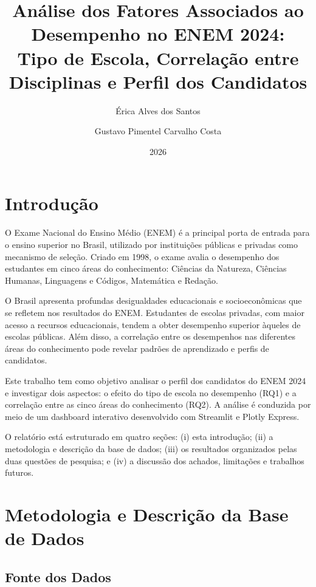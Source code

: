 \documentclass[a4paper,12pt]{article}
\title{Análise dos Fatores Associados ao Desempenho no ENEM 2024:\\
Tipo de Escola, Correlação entre Disciplinas e Perfil dos Candidatos}
\author{Érica Alves dos Santos \and Gustavo Pimentel Carvalho Costa}
\date{2026}
\begin{document}
\maketitle
\thispagestyle{empty}
\newpage

\section{Introdução}

O Exame Nacional do Ensino Médio (ENEM) é a principal porta de entrada para o ensino superior no Brasil, utilizado por instituições públicas e privadas como mecanismo de seleção. Criado em 1998, o exame avalia o desempenho dos estudantes em cinco áreas do conhecimento: Ciências da Natureza, Ciências Humanas, Linguagens e Códigos, Matemática e Redação.

O Brasil apresenta profundas desigualdades educacionais e socioeconômicas que se refletem nos resultados do ENEM. Estudantes de escolas privadas, com maior acesso a recursos educacionais, tendem a obter desempenho superior àqueles de escolas públicas. Além disso, a correlação entre os desempenhos nas diferentes áreas do conhecimento pode revelar padrões de aprendizado e perfis de candidatos.

Este trabalho tem como objetivo analisar o perfil dos candidatos do ENEM 2024 e investigar dois aspectos: o efeito do tipo de escola no desempenho (RQ1) e a correlação entre as cinco áreas do conhecimento (RQ2). A análise é conduzida por meio de um dashboard interativo desenvolvido com Streamlit e Plotly Express.

O relatório está estruturado em quatro seções: (i) esta introdução; (ii) a metodologia e descrição da base de dados; (iii) os resultados organizados pelas duas questões de pesquisa; e (iv) a discussão dos achados, limitações e trabalhos futuros.

\section{Metodologia e Descrição da Base de Dados}

\subsection{Fonte dos Dados}
\end{document}

